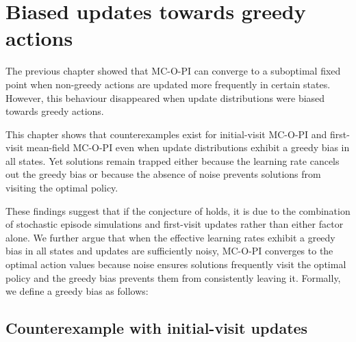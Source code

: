 \chapter{Biased updates towards greedy actions}
\label{ch: greedy bias}



\vspace{-0.6cm}

The previous chapter showed that MC-O-PI can converge to a suboptimal fixed point when non-greedy actions are updated more frequently in certain states.
However, this behaviour disappeared when update distributions were biased towards greedy actions.

\vspace{-0.1cm}

This chapter shows that counterexamples exist for initial-visit MC-O-PI and first-visit mean-field MC-O-PI even when update distributions exhibit a greedy bias in all states.
Yet solutions remain trapped either because the learning rate cancels out the greedy bias or because the absence of noise prevents solutions from visiting the optimal policy.

\vspace{-0.1cm}

These findings suggest that if the conjecture of \citet[p.~99]{Sutton2018ReinforcementIntroduction} holds, it is due to the combination of stochastic episode simulations and first-visit updates rather than either factor alone.
We further argue that when the effective learning rates exhibit a greedy bias in all states and updates are sufficiently noisy, MC-O-PI converges to the optimal action values
because noise ensures solutions frequently visit the optimal policy and the greedy bias prevents them from consistently leaving it. Formally, we define a greedy bias as follows:

\vspace{-0.2cm}




\section{Counterexample with initial-visit updates}
\label{sec: counter greedy 3s}

